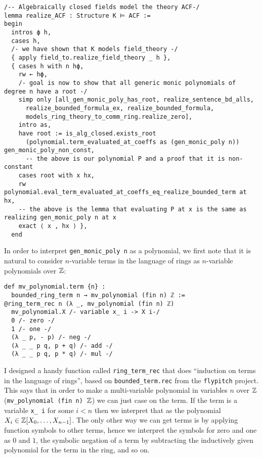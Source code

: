 \begin{lstlisting}
/-- Algebraically closed fields model the theory ACF-/
lemma realize_ACF : Structure K ⊨ ACF :=
begin
  intros ϕ h,
  cases h,
  /- we have shown that K models field_theory -/
  { apply field_to.realize_field_theory _ h },
  { cases h with n hϕ,
    rw ← hϕ,
    /- goal is now to show that all generic monic polynomials of degree n have a root -/
    simp only [all_gen_monic_poly_has_root, realize_sentence_bd_alls,
      realize_bounded_formula_ex, realize_bounded_formula,
      models_ring_theory_to_comm_ring.realize_zero],
    intro as,
    have root := is_alg_closed.exists_root
      (polynomial.term_evaluated_at_coeffs as (gen_monic_poly n)) gen_monic_poly_non_const,
      -- the above is our polynomial P and a proof that it is non-constant
    cases root with x hx,
    rw polynomial.eval_term_evaluated_at_coeffs_eq_realize_bounded_term at hx,
    -- the above is the lemma that evaluating P at x is the same as realizing gen_monic_poly n at x
    exact ⟨ x , hx ⟩ },
  end\end{lstlisting}

In order to interpret \texttt{gen\_monic\_poly n} as a polynomial,
we first note that it is natural to consider $n$-variable terms in the language of
rings as $n$-variable polynomials over $\mathbb{Z}$:

\begin{lstlisting}
def mv_polynomial.term {n} :
  bounded_ring_term n → mv_polynomial (fin n) ℤ :=
@ring_term_rec n (λ _, mv_polynomial (fin n) ℤ)
  mv_polynomial.X /- variable x_ i -> X i-/
  0 /- zero -/
  1 /- one -/
  (λ _ p, - p) /- neg -/
  (λ _ _ p q, p + q) /- add -/
  (λ _ _ p q, p * q) /- mul -/\end{lstlisting}

I designed a handy function called \texttt{ring\_term\_rec} that does
``induction on terms in the language of rings'',
based on \texttt{bounded\_term.rec} from the \texttt{flypitch} project.
This says that in order to make a multi-variable polynomial in variables $n$
over $\mathbb{Z}$ (\texttt{mv\_polynomial (fin n) $\mathbb{Z}$}) we can just case on the term.
If the term is a variable \texttt{x\_ i} for some $i < n$
then we interpret that as the polynomial $X_{i} \in \mathbb{Z}[X_{0},\dots,X_{n-1}]$.
The only other way we can get terms is by applying function symbols to other terms,
hence we interpret the symbols for zero and one as $0$ and $1$,
the symbolic negation of a term by subtracting the inductively given polynomial
for the term in the ring, and so on.

